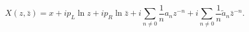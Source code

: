 \begin{equation}
   X(z,\bar{z}) =
  x + i p_L \ln z + i p_R \ln \bar{z}
  +i \sum_{n\neq 0}\frac{1}{n} a_n z^{-n}
  +i \sum_{n\neq 0}\frac{1}{n} \tilde{a}_n {\bar z}^{-n}.
\end{equation}

